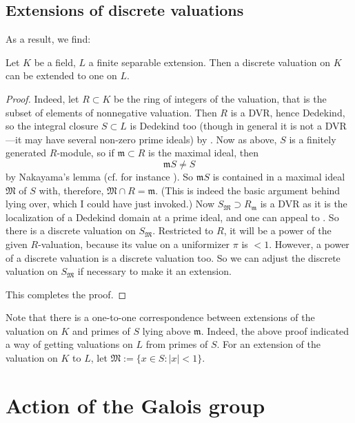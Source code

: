 \subsection{Extensions of discrete valuations}

As a result, we find: 
\begin{theorem} 
Let $K$ be a field, $L$ a finite separable extension.  Then a discrete valuation on $K$ can be extended to one on $L$.
\end{theorem}
\begin{proof}
Indeed, let $R \subset K$ be the ring of integers of the valuation, that is
the subset of elements of nonnegative valuation.  Then $R$ is a DVR, hence Dedekind, so the integral closure $S \subset L$ is Dedekind too (though in general it is not   a DVR---it may have several non-zero prime ideals) by .  Now as above, $S$ is a finitely generated $R$-module, so if $\mathfrak{m} \subset R$ is the maximal ideal, then 
\[ \mathfrak{m} S \neq S \]
by Nakayama's lemma (cf. for instance \cite{Ei95}).  So $\mathfrak{m} S$ is contained in a maximal ideal $\mathfrak{M}$ of $S$ with, therefore, $\mathfrak{M} \cap R = \mathfrak{m}$.  (This is indeed the basic argument behind lying over, which I could have just invoked.) Now $S_{\mathfrak{M}} \supset R_{\mathfrak{m}}$ is a DVR as it is the localization of a Dedekind domain at a prime ideal, and one can appeal to .  So there is a discrete valuation on $S_{\mathfrak{M}}$.  Restricted to $R$, it will be a power of the given $R$-valuation, because its value on a uniformizer $\pi$ is $<1$.  However, a power of a discrete valuation is a discrete valuation too.  So we can adjust the discrete valuation on $S_{\mathfrak{M}}$ if necessary to make it an extension.

This completes the proof.  
\end{proof}

Note that there is a one-to-one correspondence between extensions of the valuation on $K$ and primes of $S$ lying above $\mathfrak{m}$.   Indeed, the above proof indicated a way of getting valuations on $L$ from primes of $S$.  For an extension of the valuation on $K$ to $L$, let $\mathfrak{M} := \{ x \in S: \left| x \right| < 1\}$.
\section{Action of the Galois group}

